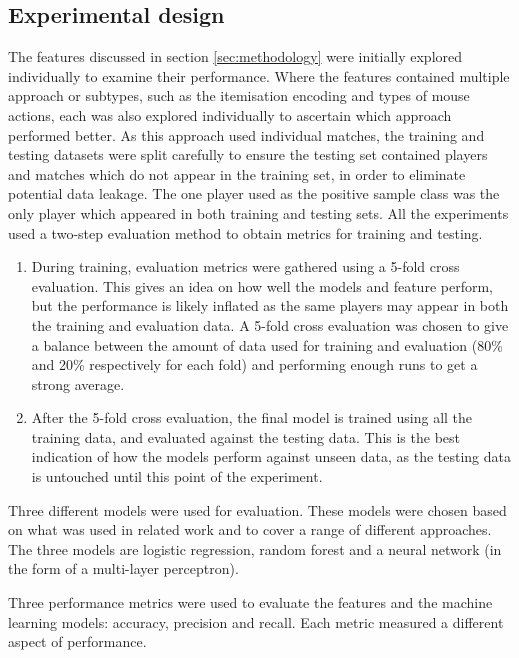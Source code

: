 \documentclass[Report.tex]{subfiles}
\begin{document}
\subsection{Experimental design}\label{sec:game-experimental}
The features discussed in section \ref{sec:methodology} were initially explored individually to examine their performance. Where the features contained multiple approach or subtypes, such as the itemisation encoding and types of mouse actions, each was also explored individually to ascertain which approach performed better. As this approach used individual matches, the training and testing datasets were split carefully to ensure the testing set contained players and matches which do not appear in the training set, in order to eliminate potential data leakage. The one player used as the positive sample class was the only player which appeared in both training and testing sets. All the experiments used a two-step evaluation method to obtain metrics for training and testing.
\begin{enumerate}
\item During training, evaluation metrics were gathered using a 5-fold cross evaluation. This gives an idea on how well the models and feature perform, but the performance is likely inflated as the same players may appear in both the training and evaluation data. A 5-fold cross evaluation was chosen to give a balance between the amount of data used for training and evaluation (80\% and 20\% respectively for each fold) and performing enough runs to get a strong average. 
\item After the 5-fold cross evaluation, the final model is trained using all the training data, and evaluated against the testing data. This is the best indication of how the models perform against unseen data, as the testing data is untouched until this point of the experiment. 
\end{enumerate}
Three different models were used for evaluation. These models were chosen based on what was used in related work \cite{starcraft-identification, dota-gao, dota-eggert, mouse-dynamics} and to cover a range of different approaches. The three models are logistic regression, random forest and a neural network (in the form of a multi-layer perceptron).

Three performance metrics were used to evaluate the features and the machine learning models: accuracy, precision and recall. Each metric measured a different aspect of performance. 
\end{document}
